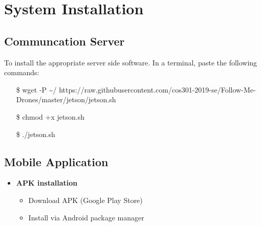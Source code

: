 \chapter{System Installation}

\section{Communcation Server}
To install the appropriate server side software.
In a terminal, paste the following commands:
\begin{itemize}
    \item[\$] wget -P \textasciitilde/ https://raw.githubusercontent.com/cos301-2019-se/Follow-Me-Drones/master/jetson/jetson.sh
    \item[\$] chmod +x jetson.sh
    \item[\$] ./jetson.sh
\end{itemize}

\section{Mobile Application}

\begin{itemize}
	\item \textbf{APK installation}
        \begin{itemize}
			\item  Download APK (Google Play Store) 
			\item  Install via Android package manager 
        \end{itemize}
\end{itemize}
